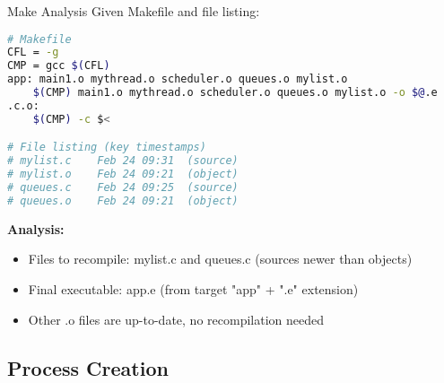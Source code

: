 \begin{example2}{Make Analysis}
    Given Makefile and file listing:
    
\begin{lstlisting}[language=bash, style=basesmol]
# Makefile
CFL = -g
CMP = gcc $(CFL)
app: main1.o mythread.o scheduler.o queues.o mylist.o
    $(CMP) main1.o mythread.o scheduler.o queues.o mylist.o -o $@.e
.c.o:
    $(CMP) -c $<

# File listing (key timestamps)
# mylist.c    Feb 24 09:31  (source)
# mylist.o    Feb 24 09:21  (object)
# queues.c    Feb 24 09:25  (source)  
# queues.o    Feb 24 09:21  (object)
\end{lstlisting}

    \tcblower
    
    \textbf{Analysis:}
    \begin{itemize}
        \item Files to recompile: mylist.c and queues.c (sources newer than objects)
        \item Final executable: app.e (from target "app" + ".e" extension)
        \item Other .o files are up-to-date, no recompilation needed
    \end{itemize}
\end{example2}

\raggedcolumns
\columnbreak

\subsection{Process Creation}

